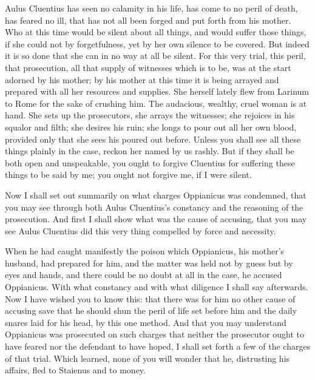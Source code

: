  Aulus Cluentius has seen no calamity in his life, has come to no peril of death, has feared no ill, that has not all been forged and put forth from his mother. Who at this time would be silent about all things, and would suffer those things, if she could not by forgetfulness, yet by her own silence to be covered. But indeed it is so done that she can in no way at all be silent. For this very trial, this peril, that prosecution, all that supply of witnesses which is to be, was at the start adorned by his mother; by his mother at this time it is being arrayed and prepared with all her resources and supplies. She herself lately flew from Larinum to Rome for the sake of crushing him. The audacious, wealthy, cruel woman is at hand. She sets up the prosecutors, she arrays the witnesses; she rejoices in his squalor and filth; she desires his ruin; she longs to pour out all her own blood, provided only that she sees his poured out before. Unless you shall see all these things plainly in the case, reckon her named by us rashly. But if they shall be both open and unspeakable, you ought to forgive Cluentius for suffering these things to be said by me; you ought not forgive me, if I were silent.

 Now I shall set out summarily on what charges Oppianicus was condemned, that you may see through both Aulus Cluentius's constancy and the reasoning of the prosecution. And first I shall show what was the cause of accusing, that you may see Aulus Cluentius did this very thing compelled by force and necessity.

 When he had caught manifestly the poison which Oppianicus, his mother's husband, had prepared for him, and the matter was held not by guess but by eyes and hands, and there could be no doubt at all in the case, he accused Oppianicus. With what constancy and with what diligence I shall say afterwards. Now I have wished you to know this: that there was for him no other cause of accusing save that he should shun the peril of life set before him and the daily snares laid for his head, by this one method. And that you may understand Oppianicus was prosecuted on such charges that neither the prosecutor ought to have feared nor the defendant to have hoped, I shall set forth a few of the charges of that trial. Which learned, none of you will wonder that he, distrusting his affairs, fled to Staienus and to money.

